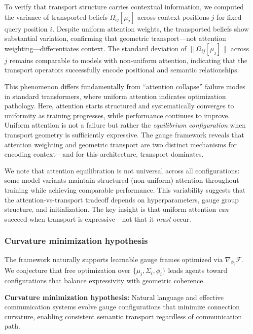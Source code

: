 \documentclass[twoside,11pt]{article}
\begin{document}
To verify that transport structure carries contextual information, we computed the variance of transported beliefs $\Omega_{ij}[\mu_j]$ across context positions $j$ for fixed query position $i$. Despite uniform attention weights, the transported beliefs show substantial variation, confirming that geometric transport---not attention weighting---differentiates context. The standard deviation of $\|\Omega_{ij}[\mu_j]\|$ across $j$ remains comparable to models with non-uniform attention, indicating that the transport operators successfully encode positional and semantic relationships.

This phenomenon differs fundamentally from ``attention collapse'' failure modes in standard transformers, where uniform attention indicates optimization pathology. Here, attention starts structured and systematically converges to uniformity as training progresses, while performance continues to improve. Uniform attention is not a failure but rather the \emph{equilibrium configuration} when transport geometry is sufficiently expressive. The gauge framework reveals that attention weighting and geometric transport are two distinct mechanisms for encoding context---and for this architecture, transport dominates.

We note that attention equilibration is not universal across all configurations: some model variants maintain structured (non-uniform) attention throughout training while achieving comparable performance. This variability suggests that the attention-vs-transport tradeoff depends on hyperparameters, gauge group structure, and initialization. The key insight is that uniform attention \emph{can} succeed when transport is expressive---not that it \emph{must} occur.

\subsubsection{Curvature minimization hypothesis}

The framework naturally supports learnable gauge frames optimized via $\nabla_{\phi_i} \mathcal{F}$. We conjecture that free optimization over $\{\mu_i, \Sigma_i, \phi_i\}$ leads agents toward configurations that balance expressivity with geometric coherence.

\textbf{Curvature minimization hypothesis:} Natural language and effective communication systems evolve gauge configurations that minimize connection curvature, enabling consistent semantic transport regardless of communication path.
\end{document}
